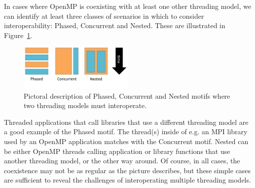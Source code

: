 In cases where OpenMP is coexisting with at least one other threading model,
we can identify at least three classes of scenarios in which to consider
interoperability: Phased, Concurrent and Nested.
These are illustrated in Figure~\ref{fig:interop-motif}.
\begin{figure}[htb]
\centering
\includegraphics[width=0.5\textwidth]{images/interop-motifs}
\caption{Pictoral description of Phased, Concurrent and Nested
motifs where two threading models must interoperate.
\label{fig:interop-motif}
}
\end{figure}
Threaded applications that call libraries that use a different threading model
are a good example of the Phased motif.
The thread(s) inside of e.g. an MPI library used by an OpenMP application
matches with the Concurrent motif.
Nested can be either OpenMP threads calling application or library
functions that use another threading model, or the other way around.
Of course, in all cases, the coexistence may not be as regular as
the picture describes, but these simple cases are sufficient to reveal
the challenges of interoperating multiple threading models.


